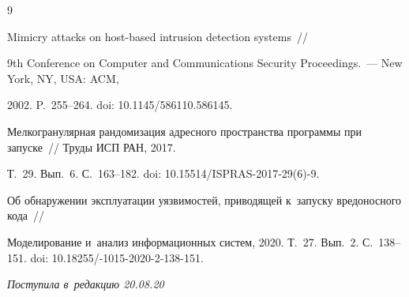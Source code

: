 {{\begin{thebibliography}{9}

 Mimicry attacks on host-based intrusion detection systems~/\!\!/ 

9th Conference on Computer and Communications Security Proceedings.~--- New York, NY, USA: ACM,

 2002. P.~255--264. doi: 10.1145/586110.586145.





Мелкогранулярная рандомизация адресного пространства программы при запуске~/\!\!/ Труды ИСП РАН, 2017. 

Т.~29. Вып.~6. С.~163--182. doi: 10.15514\!/\!ISPRAS-2017-29(6)-9.




 Об обнаружении эксплуатации уязвимостей, приводящей к~запуску вредоносного кода~/\!\!/ 

Моделирование и~анализ информационных сис\-тем, 2020. Т.~27. Вып.~2. С.~138--151. doi: 10.18255\!/-1015-2020-2-138-151.

    \end{thebibliography}

} }







\vspace*{-3pt}



\hfill{\small\textit{Поступила в~редакцию 20.08.20}}












\newpage



\vspace*{-28pt}









